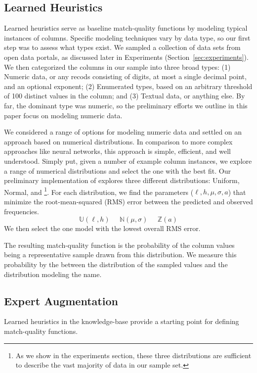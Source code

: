 \subsection{Learned Heuristics}
Learned heuristics serve as baseline match-quality functions by modeling typical instances of columns.
Specific modeling techniques vary by data type, so our first step was to assess what types exist.
We sampled a collection of \placeholder{\#\#\#} data sets from open data portals, as discussed later in Experiments (Section~\ref{sec:experiments}).
We then categorized the \placeholder{\#\#\#} columns in our sample into three broad types: 
(1) Numeric data, or any recods consisting of digits, at most a single decimal point, and an optional exponent; 
(2) Enumerated types, based on an arbitrary threshold of 100 distinct values in the column; and 
(3) Textual data, or anything else.  
By far, the dominant type was numeric, so the preliminary efforts we outline in this paper focus on modeling numeric data.

We considered a range of options for modeling numeric data and settled on an approach based on numerical distributions.
In comparison to more complex approaches like neural networks, this approach is simple, efficient, and well understood.
Simply put, given a number of example column instances, we explore a range of numerical distributions and select the one with the best fit.
Our preliminary implementation of \systemname explores three different distributions: Uniform, Normal, and \footnote{As we show in the experiments section, these three distributions are sufficient to describe the vast majority of data in our sample set.}.  
For each distribution, we find the parameters ($\ell,h,\mu,\sigma,a$) that minimize the root-mean-squared (RMS) error between the predicted and observed frequencies. 
$$\mathbb U(\ell, h)\;\;\;\;\;\mathbb N(\mu, \sigma)\;\;\;\;\;\mathbb Z(a)$$
We then select the one model with the lowest overall RMS error.

The resulting match-quality function is the probability of the column values being a representative sample drawn from this distribution.
We measure this probability by the  between the distribution of the sampled values and the distribution modeling the name.

\subsection{Expert Augmentation}
Learned heuristics in the \systemname knowledge-base provide a starting point for defining match-quality functions.




